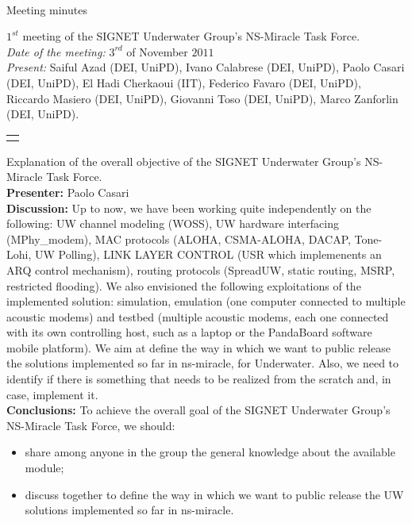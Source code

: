 \documentclass[11pt,journal,draftclsnofoot,onecolumn,twoside,letterpaper]{IEEEtran}
\theoremstyle{definition} \newtheorem{definition}[]{Definition}
\theoremstyle{theorem} \newtheorem{theorem}[]{Theorem}
\begin{document}
\pagestyle{empty}

\begin{Large} \\ \end{Large}
\begin{large} {Meeting minutes} \end{large}

\vspace{0.8cm}

 $1^{st}$ meeting of the SIGNET Underwater Group's NS-Miracle Task Force.\\
{\it Date of the meeting: } $3^{rd}$ of November $2011$\\
{\it Present: } Saiful Azad (DEI, UniPD), Ivano Calabrese (DEI, UniPD), Paolo Casari (DEI, UniPD), El Hadi Cherkaoui (IIT), Federico Favaro (DEI, UniPD), Riccardo Masiero (DEI, UniPD), Giovanni Toso (DEI, UniPD), Marco Zanforlin (DEI, UniPD).

\vspace{0.5cm}

\begin{tabular}{p{}}
 \hline \\
\end{tabular}

 Explanation of the overall objective of the SIGNET Underwater Group's NS-Miracle Task Force.\\
{\bf Presenter:} Paolo Casari\\
{\bf Discussion:} Up to now, we have been working quite independently on the following: UW channel modeling (WOSS), UW hardware interfacing (MPhy\_modem), MAC protocols (ALOHA, CSMA-ALOHA, DACAP, Tone-Lohi, UW Polling), LINK LAYER CONTROL (USR which implemenents an ARQ control mechanism), routing protocols (SpreadUW, static routing, MSRP, restricted flooding). We also envisioned the following exploitations of the implemented solution: simulation, emulation (one computer connected to multiple acoustic modems) and testbed (multiple acoustic modems, each one connected with its own controlling host, such as a laptop or the PandaBoard software mobile platform). We aim at define the way in which we want to public release the solutions implemented so far in ns-miracle, for Underwater. Also, we need to identify if there is something that needs to be realized from the scratch and, in case, implement it.\\
{\bf Conclusions:} To achieve the overall goal of the SIGNET Underwater Group's NS-Miracle Task Force, we should:
\begin{itemize}
 \item share among anyone in the group the general knowledge about the available module;
 \item discuss together to define the way in which we want to public release the UW solutions implemented so far in ns-miracle.
\end{itemize}
\end{document}

